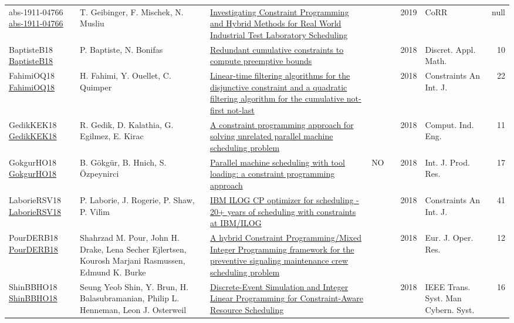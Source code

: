 {\begin{longtable}{p{3cm}p{6cm}p{7cm}rrrp{3cm}r}
abs-1911-04766 \href{http://arxiv.org/abs/1911.04766}{abs-1911-04766} & T. Geibinger, F. Mischek, N. Musliu & \href{articles/abs-1911-04766.pdf}{Investigating Constraint Programming and Hybrid Methods for Real World Industrial Test Laboratory Scheduling} &  & \cite{abs-1911-04766} & 2019 & CoRR & null\\
BaptisteB18 \href{https://doi.org/10.1016/j.dam.2017.05.001}{BaptisteB18} & P. Baptiste, N. Bonifas & \href{articles/BaptisteB18.pdf}{Redundant cumulative constraints to compute preemptive bounds} &  & \cite{BaptisteB18} & 2018 & Discret. Appl. Math. & 10\\
FahimiOQ18 \href{https://doi.org/10.1007/s10601-018-9282-9}{FahimiOQ18} & H. Fahimi, Y. Ouellet, C. Quimper & \href{articles/FahimiOQ18.pdf}{Linear-time filtering algorithms for the disjunctive constraint and a quadratic filtering algorithm for the cumulative not-first not-last} &  & \cite{FahimiOQ18} & 2018 & Constraints An Int. J. & 22\\
GedikKEK18 \href{https://doi.org/10.1016/j.cie.2018.05.014}{GedikKEK18} & R. Gedik, D. Kalathia, G. Egilmez, E. Kirac & \href{articles/GedikKEK18.pdf}{A constraint programming approach for solving unrelated parallel machine scheduling problem} &  & \cite{GedikKEK18} & 2018 & Comput. Ind. Eng. & 11\\
GokgurHO18 \href{https://doi.org/10.1080/00207543.2017.1421781}{GokgurHO18} & B. G{\"{o}}kg{\"{u}}r, B. Hnich, S. {\"{O}}zpeynirci & \href{articles/GokgurHO18.pdf}{Parallel machine scheduling with tool loading: a constraint programming approach} & NO & \cite{GokgurHO18} & 2018 & Int. J. Prod. Res. & 17\\
LaborieRSV18 \href{https://doi.org/10.1007/s10601-018-9281-x}{LaborieRSV18} & P. Laborie, J. Rogerie, P. Shaw, P. Vil{\'{\i}}m & \href{articles/LaborieRSV18.pdf}{{IBM} {ILOG} {CP} optimizer for scheduling - 20+ years of scheduling with constraints at {IBM/ILOG}} &  & \cite{LaborieRSV18} & 2018 & Constraints An Int. J. & 41\\
PourDERB18 \href{https://doi.org/10.1016/j.ejor.2017.08.033}{PourDERB18} & Shahrzad M. Pour, John H. Drake, Lena Secher Ejlertsen, Kourosh Marjani Rasmussen, Edmund K. Burke & \href{articles/PourDERB18.pdf}{A hybrid Constraint Programming/Mixed Integer Programming framework for the preventive signaling maintenance crew scheduling problem} &  & \cite{PourDERB18} & 2018 & Eur. J. Oper. Res. & 12\\
ShinBBHO18 \href{https://doi.org/10.1109/TSMC.2017.2681623}{ShinBBHO18} & Seung Yeob Shin, Y. Brun, H. Balasubramanian, Philip L. Henneman, Leon J. Osterweil & \href{articles/ShinBBHO18.pdf}{Discrete-Event Simulation and Integer Linear Programming for Constraint-Aware Resource Scheduling} &  & \cite{ShinBBHO18} & 2018 & {IEEE} Trans. Syst. Man Cybern. Syst. & 16\\

\end{longtable}}
